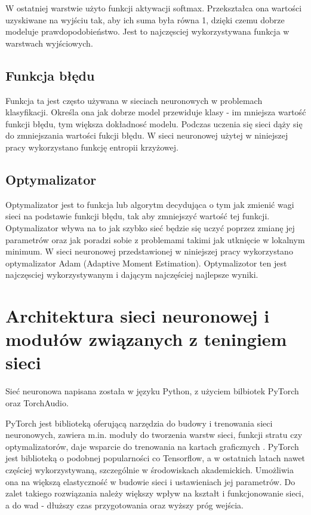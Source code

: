 \documentclass{sprz}
\begin{document}
W ostatniej warstwie użyto funkcji aktywacji softmax. Przekształca ona wartości uzyskiwane na wyjściu tak, aby ich suma była równa 1, dzięki czemu dobrze modeluje prawdopodobieństwo. Jest to najczęsciej wykorzystywana funkcja w warstwach wyjściowych.

\subsection{Funkcja błędu}
Funkcja ta jest często używana w sieciach neuronowych w problemach klasyfikacji. Określa ona jak dobrze model przewiduje klasy - im mniejsza wartość funkcji błędu, tym większa dokładnosć modelu. Podczas uczenia się sieci dąży się do zmniejszania wartości fukcji błędu. W sieci neuronowej użytej w niniejszej pracy wykorzystano funkcję entropii krzyżowej.

\subsection{Optymalizator}
Optymalizator jest to funkcja lub algorytm decydująca o tym jak zmienić wagi sieci na podstawie funkcji błędu, tak aby zmniejszyć wartość tej funkcji. Optymalizator wływa na to jak szybko sieć będzie się uczyć poprzez zmianę jej parametrów oraz jak poradzi sobie z problemami takimi jak utknięcie w lokalnym minimum. W sieci neuronowej przedstawionej w niniejszej pracy wykorzystano optymalizator Adam (Adaptive Moment Estimation). Optymalizotor ten jest najczęsciej wykorzystywanym i dającym najczęściej najlepsze wyniki.

\section{Architektura sieci neuronowej i modułów związanych z teningiem sieci}
Sieć neuronowa napisana została w języku Python, z użyciem bilbiotek PyTorch oraz TorchAudio. 


PyTorch jest biblioteką oferującą narzędzia do budowy i trenowania sieci neuronowych, zawiera m.in. moduły do tworzenia warstw sieci, funkcji stratu czy optymalizatorów, daje wsparcie do trenowania na kartach graficznych \cite{pytorch}.
PyTorch jest biblioteką o podobnej popularności co Tensorflow, a w ostatnich latach nawet częściej wykorzystywaną, szczególnie w środowiskach akademickich. Umożliwia ona na większą elastyczność w budowie sieci i ustawieniach jej parametrów. Do zalet takiego rozwiązania należy większy wpływ na kształt i funkcjonowanie sieci, a do wad - dłuższy czas przygotowania oraz wyższy próg wejścia. 
\end{document}
